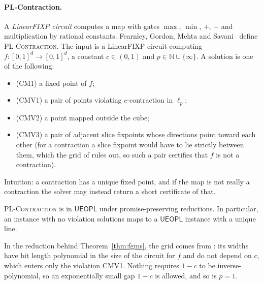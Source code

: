 \paragraph{PL-Contraction.} A \emph{LinearFIXP circuit} computes a map with gates $\max$, $\min$, $+$,
$-$ and multiplication by rational constants. Fearnley, Gordon, Mehta and
Savani~\cite[Def.~32]{fgms18} define \textsc{PL-Contraction}. The input is a LinearFIXP circuit computing
$f:[0,1]^d\to[0,1]^d$, a constant $c\in(0,1)$ and $p\in\mathbb N\cup\{\infty\}$. A solution is one of the
following:
\begin{itemize}[nosep]
  \item (CM1) a fixed point of $f$;
  \item (CMV1) a pair of points violating $c$-contraction in $\ell_p$;
  \item (CMV2) a point mapped outside the cube;
  \item (CMV3) a pair of adjacent slice fixpoints whose directions point toward each other (for a contraction a slice fixpoint would have to lie strictly between them, which the grid of \cite[Lemma~30]{fgms18} rules out, so such a pair certifies that $f$ is not a contraction).
\end{itemize}
Intuition: a contraction has a unique fixed point, and if the map is not really a contraction the
solver may instead return a short certificate of that.

\begin{theorem}\label{thm:fgms}
\statuscited
\textnormal{\textsc{PL-Contraction}} is in $\mathsf{UEOPL}$ under promise-preserving reductions. In particular, an
instance with no violation solutions maps to a $\mathsf{UEOPL}$ instance with a unique line.
\end{theorem}

In the reduction behind Theorem~\ref{thm:fgms}, the grid comes from \cite[Lemma~30]{fgms18}: its widths have bit length polynomial in the size of the circuit for $f$ and do not depend on $c$, which enters only the violation CMV1. Nothing requires $1-c$ to be inverse-polynomial, so an exponentially small gap
$1-c$ is allowed, and so is $p=1$.

